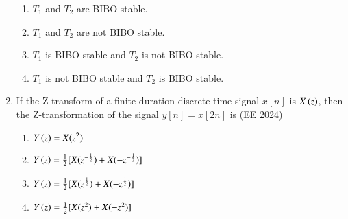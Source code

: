 \documentclass[journal,12pt,onecolumn]{IEEEtran}
\theoremstyle{remark}
\begin{document}
\begin{enumerate}
\begin{enumerate}
\item $T_1$ and $T_2$ are BIBO stable.
\item $T_1$ and $T_2$ are not BIBO stable.
\item $T_1$ is BIBO stable and $T_2$ is not BIBO stable.
\item $T_1$ is not BIBO stable and $T_2$ is BIBO stable.
\end{enumerate}
\item If the Z-transform of a finite-duration discrete-time signal $x[n]$ is $X\left(z\right)$, then the  Z-transformation of the signal $y[n]=x[2n]$ is
 \hfill{(EE 2024)}
\begin{enumerate}
\item $Y\left(z\right)=X(z^{2})$
\item $Y\left(z\right)=\frac{1}{2}[X(z^{-\frac{1}{2}})+X(-z^{-\frac{1}{2}})]$
\item $Y\left(z\right)=\frac{1}{2}[X(z^{\frac{1}{2}})+X(-z^{\frac{1}{2}})]$
\item $Y\left(z\right)=\frac{1}{2}[X(z^{2})+X(-z^{2})]$
\end{enumerate}
\end{enumerate}
\end{document}
